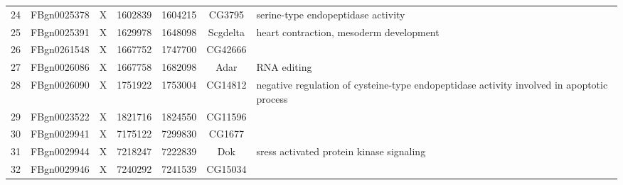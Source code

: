 \begin{tabular}{c|c|c|c|c|c | p{4in}}
24	&FBgn0025378	&X	&1602839	&1604215	&CG3795 & serine-type endopeptidase activity\\
25	&FBgn0025391	&X	&1629978	&1648098	&Scgdelta & heart contraction, mesoderm development\\
26	&FBgn0261548	&X	&1667752	&1747700	&CG42666\\
27	&FBgn0026086	&X	&1667758	&1682098	&Adar & RNA editing\\
28	&FBgn0026090	&X	&1751922	&1753004	&CG14812 & negative regulation of cysteine-type endopeptidase activity involved in apoptotic process\\
29	&FBgn0023522	&X	&1821716	&1824550	&CG11596&\\
30	&FBgn0029941	&X	&7175122	&7299830	&CG1677\\
31	&FBgn0029944	&X	&7218247	&7222839	&Dok & sress activated protein kinase signaling\\
32	&FBgn0029946	&X	&7240292	&7241539	&CG15034\\
\end{tabular}
